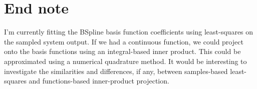 \documentclass[11pt]{article}
\begin{document}
\section{End note}
\label{sec:org1620730}

I'm currently fitting the BSpline basis function coefficients using least-squares on the sampled system output.
If we had a continuous function, we could project onto the basis functions using an integral-based inner product.
This could be approximated using a numerical quadrature method.
It would be interesting to investigate the similarities and differences, if any, between samples-based least-squares and functions-based inner-product projection.



\vspace{2in}
\end{document}
